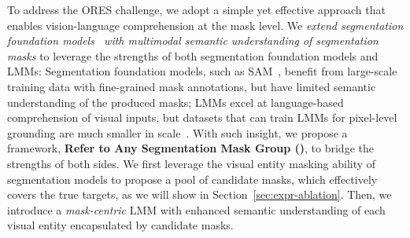 \begin{table}[ht]
    \centering
    \caption{\textbf{Comparison with existing paradigms.} Our omnimodal referring expression segmentation (ORES) task poses new challenges for all prior methods, including allowing mask-based visual prompts for reference visual entities and predicting a group of masks. \cmark: supported, $\circ$: partially supported, \xmark: unsupported.
    }
    \label{tab:comparison}
\end{table}

To address the ORES challenge, we adopt a simple yet effective approach that enables vision-language comprehension at the mask level. We \emph{extend segmentation foundation models~\cite{kirillov2023segment} with multimodal semantic understanding of segmentation masks} to leverage the strengths of both segmentation foundation models and LMMs:
Segmentation foundation models, such as SAM~\cite{kirillov2023segment}, benefit from large-scale training data with fine-grained mask annotations, but have limited semantic understanding of the produced masks; LMMs excel at language-based comprehension of visual inputs, but datasets that can train LMMs for pixel-level grounding are much smaller in scale~\cite{lai2024lisa}.
With such insight, we propose a framework, \textbf{Refer to Any Segmentation Mask Group (\ourmodel)}, to bridge the strengths of both sides. We first leverage the visual entity masking ability of segmentation models to propose a pool of candidate masks, which effectively covers the true targets, as we will show in Section~\ref{sec:expr-ablation}. Then, we introduce a \emph{mask-centric} LMM with enhanced semantic understanding of each visual entity encapsulated by candidate masks.

